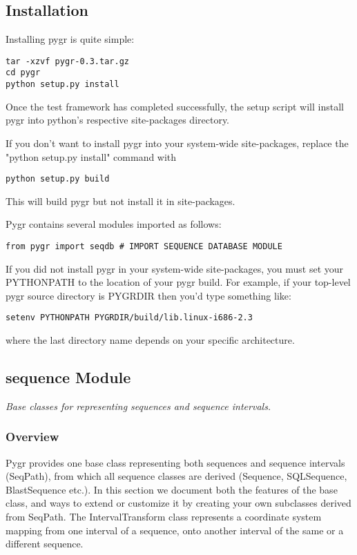 \documentclass{howto}
\begin{document}
\subsection{Installation}
\label{install}
Installing pygr is quite simple:
\begin{verbatim}
tar -xzvf pygr-0.3.tar.gz 
cd pygr
python setup.py install 
\end{verbatim}

Once the test framework has completed successfully, the setup script
will install pygr into python's respective site-packages directory. 

If you don't want to install pygr into your system-wide site-packages,
replace the "python setup.py install" command with
\begin{verbatim}
python setup.py build
\end{verbatim}
This will build pygr but not install it in site-packages.

Pygr contains several modules imported as follows:
\begin{verbatim}
from pygr import seqdb # IMPORT SEQUENCE DATABASE MODULE
\end{verbatim}

If you did not install pygr in your system-wide site-packages, you 
must set your PYTHONPATH to the location of your pygr build.
For example, if your top-level pygr source directory is PYGRDIR then
you'd type something like:
\begin{verbatim}
setenv PYTHONPATH PYGRDIR/build/lib.linux-i686-2.3
\end{verbatim}
where the last directory name depends on your specific architecture.


\subsection{sequence Module}
\label{sequence}

{\em Base classes for representing sequences and sequence intervals.}


\subsubsection{Overview}
Pygr provides one base class representing both sequences and sequence intervals (SeqPath),
from which all sequence classes are derived (Sequence, SQLSequence, BlastSequence etc.).
In this section we document both the features of the base class, and ways to extend or
customize it by creating your own subclasses derived from SeqPath.  The IntervalTransform
class represents a coordinate system mapping from one interval of a sequence, onto 
another interval of the same or a different sequence.
\end{document}
